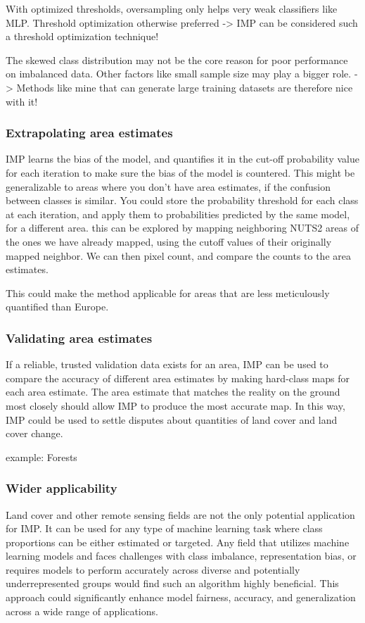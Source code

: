         With optimized thresholds, oversampling only helps very weak classifiers like MLP. Threshold optimization otherwise preferred \citep{elor2022smote} -> IMP can be considered such a threshold optimization technique!

        The skewed class distribution may not be the core reason for poor performance on imbalanced data. Other factors like small sample size may play a bigger role. \citep{elor2022smote} -> Methods like mine that can generate large training datasets are therefore nice with it!
        

        \subsubsection{Extrapolating area estimates}
            IMP learns the bias of the model, and quantifies it in the cut-off probability value for each iteration to make sure the bias of the model is countered. This might be generalizable to areas where you don't have area estimates, if the confusion between classes is similar.
            You could store the probability threshold for each class at each iteration, and apply them to probabilities predicted by the same model, for a different area.
            this can be explored by mapping neighboring NUTS2 areas of the ones we have already mapped, using the cutoff values of their originally mapped neighbor. We can then pixel count, and compare the counts to the area estimates.

            This could make the method applicable for areas that are less meticulously quantified than Europe.
        
        \subsubsection{Validating area estimates}
            If a reliable, trusted validation data exists for an area, IMP can be used to compare the accuracy of different area estimates by making hard-class maps for each area estimate. The area estimate that matches the reality on the ground most closely should allow IMP to produce the most accurate map.
            In this way, IMP could be used to settle disputes about quantities of land cover and land cover change.

            example: Forests

        \subsubsection{Wider applicability}
            Land cover and other remote sensing fields are not the only potential application for IMP. It can be used for any type of machine learning task where class proportions can be either estimated or targeted. Any field that utilizes machine learning models and faces challenges with class imbalance, representation bias, or requires models to perform accurately across diverse and potentially underrepresented groups would find such an algorithm highly beneficial. This approach could significantly enhance model fairness, accuracy, and generalization across a wide range of applications.

